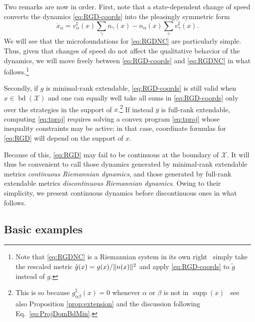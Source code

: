 \documentclass[reqno]{amsart}
\DeclarePairedDelimiter{\norm}{\lVert}{\rVert}
\theoremstyle{plain}
\theoremstyle{definition}
\theoremstyle{remark}
\numberwithin{equation}{section}
\numberwithin{theorem}{section}
\begin{document}
Two remarks are now in order.
First, note that a state-dependent change of speed converts the dynamics \eqref{eq:RGD-coords} into the pleasingly symmetric form
\begin{equation}\label{eq:RGDNC}
\dot x_{\alpha}
	= {v}^{\sharp}_{\alpha}(x){{\sum\nolimits}_{\gamma} {n}_{\gamma}(x)} - {n}_{\alpha}(x) {\sum\nolimits}_{\gamma} {v}^{\sharp}_{\gamma}(x).
\end{equation}
We will see that the microfoundations for \eqref{eq:RGDNC} are particularly simple.
Thus, given that changes of speed do not affect the qualitative behavior of the dynamics, we will move freely between \eqref{eq:RGD-coords} and \eqref{eq:RGDNC} in what follows.\footnote{\label{fn:Conformal}
Note that \eqref{eq:RGDNC} is a Riemannian system in its own right \textendash\ simply take the rescaled metric $\tilde g(x) = g(x) / \norm{{n}(x)}^{2}$ and apply \eqref{eq:RGD-coords} to $\tilde g$ instead of $g$.}

Secondly, if $g$ is minimal-rank extendable, \eqref{eq:RGD-coords} is still valid when $x\in\operatorname{bd}({\mathcal{X}})$ and one can equally well take all sums in \eqref{eq:RGD-coords} only over the strategies in the support of $x$.\footnote{This is so because $g_{\alpha\beta}^{\sharp}(x) = 0$ whenever $\alpha$ or $\beta$ is not in $\operatorname{supp}(x)$ \textendash\ see also Proposition \ref{prop:extension} and the discussion following Eq.~\eqref{eq:ProjDomBdMin}.}
If instead $g$ is full-rank extendable, computing \eqref{eq:tproj} requires solving a convex program \eqref{eq:tproj} whose inequality constraints may be active;
in that case, coordinate formulas for \eqref{eq:RGD} will depend on the support of $x$.

Because of this, \eqref{eq:RGD} may fail to be continuous at the boundary of ${\mathcal{X}}$.
It will thus be convenient to call those dynamics generated by minimal-rank extendable metrics \emph{continuous Riemannian dynamics}, and those generated by full-rank extendable metrics \emph{discontinuous Riemannian dynamics}.
Owing to their simplicity, we present continuous dynamics before discontinuous ones in what follows.

\subsection{Basic examples}
\label{sec:Lexamples}
\end{document}
